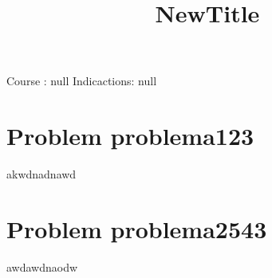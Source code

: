 \documentclass{article}
\title{NewTitle}
\begin{document}
 
\maketitle 
Course : null
Indicactions: 
null
\section{Problem problema123 } 
akwdnadnawd\section{Problem problema2543 } 
awdawdnaodw
\end{document}
